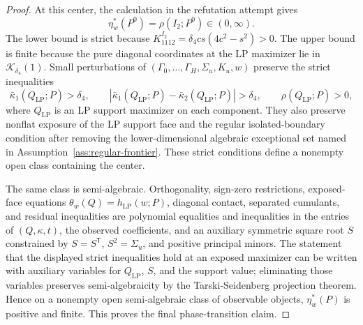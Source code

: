 \documentclass[11pt]{article}
\newcommand{\transpose}{\mathsf{T}}
\theoremstyle{definition}
\theoremstyle{plain}
\theoremstyle{remark}
\begin{document}
\begin{proof}
At this center, the calculation in the refutation attempt gives
\[
\eta_w^*(P^0)=\rho(I_2;P^0)\in(0,\infty).
\]
The lower bound is strict because \(K^{I_2}_{1112}=\delta_4cs(4c^2-s^2)>0\).  The upper bound is finite because the pure diagonal coordinates at the LP maximizer lie in \(\mathcal K_{\delta_4}(1)\).  Small perturbations of \((\Gamma_0,\ldots,\Gamma_H,\Sigma_u,K_u,w)\) preserve the strict inequalities
\[
\bar\kappa_1(Q_{\mathrm{LP}};P)>\delta_4,\qquad
|\bar\kappa_1(Q_{\mathrm{LP}};P)-\bar\kappa_2(Q_{\mathrm{LP}};P)|>\delta_4,\qquad
\rho(Q_{\mathrm{LP}};P)>0,
\]
where \(Q_{\mathrm{LP}}\) is an LP support maximizer on each component.  They also preserve nonflat exposure of the LP support face and the regular isolated-boundary condition after removing the lower-dimensional algebraic exceptional set named in Assumption~\ref{ass:regular-frontier}.  These strict conditions define a nonempty open class containing the center.

The same class is semi-algebraic.  Orthogonality, sign-zero restrictions, exposed-face equations \(\theta_w(Q)=h_{\mathrm{LP}}(w;P)\), diagonal contact, separated cumulants, and residual inequalities are polynomial equalities and inequalities in the entries of \((Q,\kappa,t)\), the observed coefficients, and an auxiliary symmetric square root \(S\) constrained by \(S=S^\transpose\), \(S^2=\Sigma_u\), and positive principal minors.  The statement that the displayed strict inequalities hold at an exposed maximizer can be written with auxiliary variables for \(Q_{\mathrm{LP}}\), \(S\), and the support value; eliminating those variables preserves semi-algebraicity by the Tarski-Seidenberg projection theorem.  Hence on a nonempty open semi-algebraic class of observable objects, \(\eta_w^*(P)\) is positive and finite.  This proves the final phase-transition claim.
\end{proof}
\end{document}
